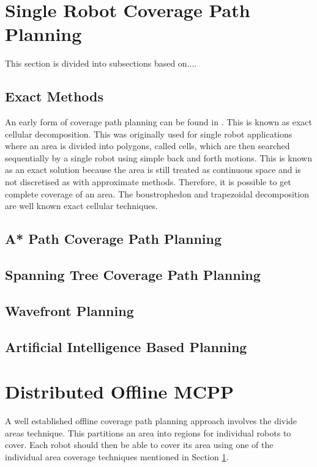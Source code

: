 \section{Single Robot Coverage Path Planning}
\label{sec:lit SR CPP}
This section is divided into subsections based on....
\subsection{Exact Methods}
\label{sec:lit SR CPP - Exact}
An early form of coverage path planning can be found in \cite{Choset2001}. This is known as exact cellular decomposition. This was originally used for single robot applications where an area is divided into polygons, called cells, which are then searched sequentially by a single robot using simple back and forth motions. This is known as an exact solution because the area is still treated as continuous space and is not discretised as with approximate methods. Therefore, it is possible to get complete coverage of an area. The boustrophedon and trapezoidal decomposition are well known exact cellular techniques.\\
\subsection{A* Path Coverage Path Planning}
\subsection{Spanning Tree Coverage Path Planning}
\label{sec:lit SR CPP - STC}

\subsection{Wavefront Planning}
\subsection{Artificial Intelligence Based Planning}
\section{Distributed Offline MCPP}
\label{sec:lit Ditributed MCPP}
A well established offline coverage path planning approach involves the divide areas technique. This partitions an area into regions for individual robots to cover. Each robot should then be able to cover its area using one of the individual area coverage techniques mentioned in Section \ref{sec:lit SR CPP}.
